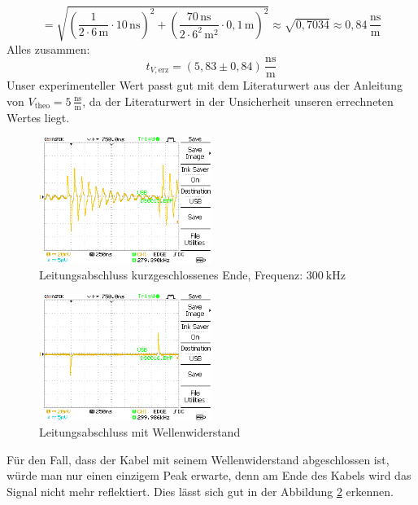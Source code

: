 \documentclass{article}
\begin{document}
\[
=
\sqrt{
\left( \frac{1}{2 \cdot 6\,\text{m}} \cdot 10\,\text{ns} \right)^2 +
\left( \frac{70\,\text{ns}}{2 \cdot 6^2\,\text{m}^2} \cdot 0{,}1\,\text{m} \right)^2
}
\approx \sqrt{0{,}7034} \approx 0{,}84\,\frac{\text{ns}}{\text{m}}
\]
Alles zusammen:\\
\[
t_{V,\text{erz}} = (5{,}83 \pm 0{,}84)\,\frac{\text{ns}}{\text{m}}
\]
Unser experimenteller Wert passt gut mit dem Literaturwert aus der Anleitung \cite{anleitung} 
von ${V_\text{theo}} = 5\,\frac{\text{ns}}{\text{m}}$, da der Literaturwert in der Unsicherheit unseren errechneten Wertes liegt. 


				\begin{figure}[H]
					\centering
					\includegraphics[width=0.5\textwidth]{MesswerteVersuch1/DS0015.png}	

					\caption{Leitungsabschluss kurzgeschlossenes Ende, Frequenz: $\SI{300}{\kilo\hertz}$}
					\label{fig:DS0015}
				\end{figure}
				\begin{figure}[H]
					\centering
					\includegraphics[width=0.5\textwidth]{MesswerteVersuch1/DS0016.png}	

					\caption{Leitungsabschluss mit Wellenwiderstand}
					\label{fig:DS0016}
				\end{figure}

                Für den Fall, dass der Kabel mit seinem Wellenwiderstand abgeschlossen ist, würde man nur einen
                einzigem Peak erwarte, denn am Ende des Kabels wird das Signal nicht mehr reflektiert. Dies lässt sich
                gut in der Abbildung \ref*{fig:DS0016} erkennen.
\clearpage
\end{document}
